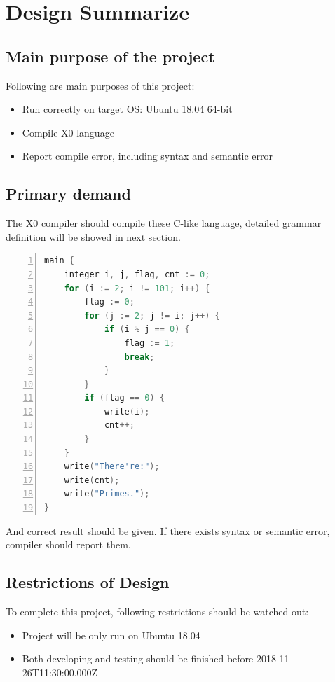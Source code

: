 \documentclass{article}
\begin{document}
		\section{Design Summarize}
		\subsection{Main purpose of the project}
		Following are main purposes of this project:
		\begin{itemize}
		\item Run correctly on target OS: Ubuntu 18.04 64-bit
		\item Compile X0 language
		\item Report compile error, including syntax and semantic error 
		\end{itemize}
		\subsection{Primary demand}
		The X0 compiler should compile these C-like language, detailed grammar definition will be showed in next section.
		\begin{lstlisting}[language={C},numbers=left,numberstyle=\tiny,%frame=shadowbox,  
   rulesepcolor=\color{red!20!green!20!blue!20},  
   keywordstyle=\color{blue!70!black},  
   commentstyle=\color{blue!90!},  
   basicstyle=\ttfamily]  
main {
	integer i, j, flag, cnt := 0;
	for (i := 2; i != 101; i++) {
		flag := 0;
		for (j := 2; j != i; j++) { 
			if (i % j == 0) {
				flag := 1;
				break;
			}
		}
		if (flag == 0) {
			write(i);
			cnt++;
		}
	}
	write("There're:");
	write(cnt);
	write("Primes.");
}
		\end{lstlisting}
		And correct result should be given. If there exists syntax or semantic error, compiler should report them.
		\subsection{Restrictions of Design}
		To complete this project, following restrictions should be watched out:
		\begin{itemize}
		\item Project will be only run on Ubuntu 18.04
		\item Both developing and testing should be finished before 2018-11-26T11:30:00.000Z
		\end{itemize}
\end{document}
